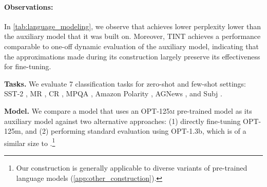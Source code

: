 \paragraph{Observations:}
In \cref{tab:language_modeling}, we observe  that \simulator{} achieves lower perplexity lower than the auxiliary model that it was built on. Moreover, TINT achieves a performance comparable to one-off dynamic evaluation of the auxiliary model, indicating that the approximations made during its construction largely preserve its effectiveness for fine-tuning. 
\fi 

\textbf{Tasks.} 
We evaluate 7 classification tasks for zero-shot and few-shot settings: 
\textsc{SST-2} \citep{socher2013recursive}, MR \citep{pang2004sentimental}, CR \citep{hu2004mining}, MPQA \citep{wiebe2005annotating}, Amazon Polarity \citep{zhang2015character}, AGNews \citep{zhang2015character}, and Subj \citep{pang2005seeing}.  





\textbf{Model.} We compare a \simulator{} model that uses an \textsc{OPT-125m} pre-trained model as its auxiliary model against two alternative approaches: (1) directly fine-tuning OPT-125m, and (2) performing standard evaluation using OPT-1.3b, which is of a similar size to \simulator{}.\footnote{Our construction is generally applicable to diverse variants of pre-trained language models (\cref{app:other_construction}).} 

